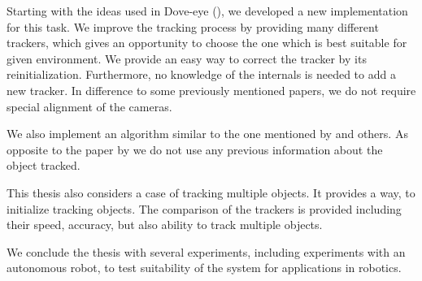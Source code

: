 Starting with the ideas used in Dove-eye (\citet*{dove-eye}), we developed a
new implementation for this task. We improve the tracking process by providing
many different trackers, which gives an opportunity to choose the one which is
best suitable for given environment. We provide an easy way to correct the
tracker by its reinitialization. Furthermore, no knowledge of the internals is
needed to add a new tracker.  In difference to some previously mentioned
papers, we do not require special alignment of the cameras. 

We also implement an algorithm similar to the one mentioned by
\citet*{ibisch2015arbitrary} and others. As opposite to the paper by
\citet*{kappeler20103d} we do not use any previous information about the object
tracked.

This thesis also considers a case of tracking multiple objects. It provides a
way, to initialize tracking objects. The comparison of the trackers is
provided including their speed, accuracy, but also ability to track
multiple objects.

We conclude the thesis with several experiments, including experiments with an autonomous
robot, to test suitability of the system for applications in robotics.
